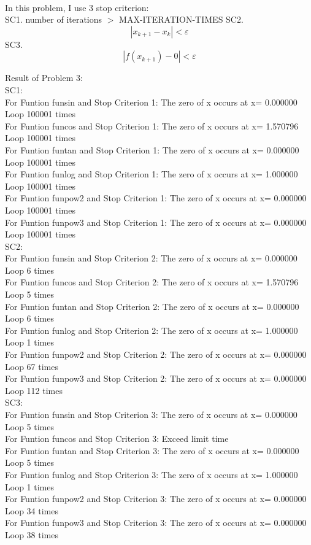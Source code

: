 \documentclass[12pt]{article}
\newenvironment{problem}[2][Problem]{\begin{trivlist}
\item[\hskip \labelsep {\bfseries #1}\hskip \labelsep {\bfseries #2.}]}{\end{trivlist}}
\begin{document}
\begin{problem}{3}
\text{ }\\
In this problem, I use 3 stop criterion:\\
SC1. number of iterations $>$ MAX-ITERATION-TIMES 
SC2. \[\left | x_{k+1}-x_{k} \right |< \varepsilon \]
SC3. \[ \left | f(x_{k+1})-0 \right |<\varepsilon \]

\item Result of Problem 3:\\
SC1:\\
For Funtion funsin and Stop Criterion 1:	 The zero of x occurs at x= 0.000000 	Loop 100001 times\\
For Funtion funcos and Stop Criterion 1:	 The zero of x occurs at x= 1.570796 	Loop 100001 times\\
For Funtion funtan and Stop Criterion 1:	 The zero of x occurs at x= 0.000000 	Loop 100001 times\\
For Funtion funlog and Stop Criterion 1:	 The zero of x occurs at x= 1.000000 	Loop 100001 times\\
For Funtion funpow2 and Stop Criterion 1:	 The zero of x occurs at x= 0.000000 	Loop 100001 times\\
For Funtion funpow3 and Stop Criterion 1:	 The zero of x occurs at x= 0.000000 	Loop 100001 times\\

SC2:\\
For Funtion funsin and Stop Criterion 2:	 The zero of x occurs at x= 0.000000 	Loop 6 times\\
For Funtion funcos and Stop Criterion 2:	 The zero of x occurs at x= 1.570796 	Loop 5 times\\
For Funtion funtan and Stop Criterion 2:	 The zero of x occurs at x= 0.000000 	Loop 6 times\\
For Funtion funlog and Stop Criterion 2:	 The zero of x occurs at x= 1.000000 	Loop 1 times\\
For Funtion funpow2 and Stop Criterion 2:	 The zero of x occurs at x= 0.000000 	Loop 67 times\\
For Funtion funpow3 and Stop Criterion 2:	 The zero of x occurs at x= 0.000000 	Loop 112 times\\

SC3:\\
For Funtion funsin and Stop Criterion 3:	 The zero of x occurs at x= 0.000000 	Loop 5 times\\
For Funtion funcos and Stop Criterion 3:	 Exceed limit time\\
For Funtion funtan and Stop Criterion 3:	 The zero of x occurs at x= 0.000000 	Loop 5 times\\
For Funtion funlog and Stop Criterion 3:	 The zero of x occurs at x= 1.000000 	Loop 1 times\\
For Funtion funpow2 and Stop Criterion 3:	 The zero of x occurs at x= 0.000000 	Loop 34 times\\
For Funtion funpow3 and Stop Criterion 3:	 The zero of x occurs at x= 0.000000 	Loop 38 times\\

\end{problem}
 
\end{document}
